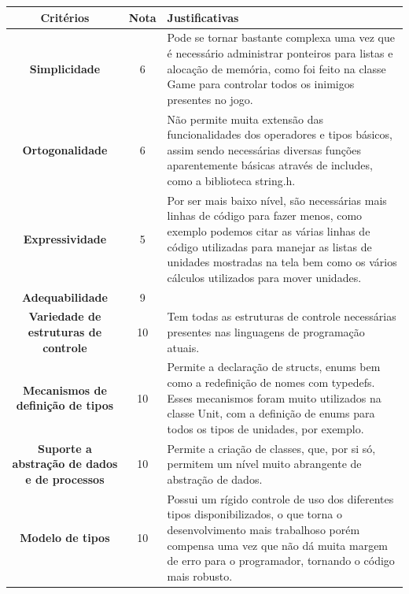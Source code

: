 \documentclass[rel_mlp]{iiufrgs}
\begin{document}
 \begin{center}
\begin{tabular}{ |c|c|p{80mm} }
\hline
	\textbf{Critérios} & \textbf{Nota} & \textbf{Justificativas} \\
\hline
\textbf{Simplicidade} & 6 & Pode se tornar bastante complexa uma vez que é necessário administrar ponteiros para listas e alocação de memória, como foi feito na classe Game para controlar todos os inimigos presentes no jogo.\\
\textbf{Ortogonalidade} & 6 & Não permite muita extensão das funcionalidades dos operadores e tipos básicos, assim sendo necessárias diversas funções aparentemente básicas através de includes, como a biblioteca string.h.\\
\textbf{Expressividade} & 5 & Por ser mais baixo nível, são necessárias mais linhas de código para fazer menos, como exemplo podemos citar as várias linhas de código utilizadas para manejar as listas de unidades mostradas na tela bem como os vários cálculos utilizados para mover unidades. \\
\textbf{Adequabilidade} & 9 &  \\
\textbf{Variedade de estruturas de controle} & 10 & Tem todas as estruturas de controle necessárias presentes nas linguagens de programação atuais. \\
\textbf{Mecanismos de definição de tipos} & 10 & Permite a declaração de structs, enums bem como a redefinição de nomes com typedefs. Esses mecanismos foram muito utilizados na classe Unit, com a definição de enums para todos os tipos de unidades, por exemplo.\\
\textbf{Suporte a abstração de dados e de processos} & 10 & Permite a criação de classes, que, por si só, permitem um nível muito abrangente de abstração de dados. \\
\textbf{Modelo de tipos} & 10 & Possui um rígido controle de uso dos diferentes tipos disponibilizados, o que torna o desenvolvimento mais trabalhoso porém compensa uma vez que não dá muita margem de erro para o programador, tornando o código mais robusto.\\
\hline
\end{tabular}
\end{center}
\end{document}
